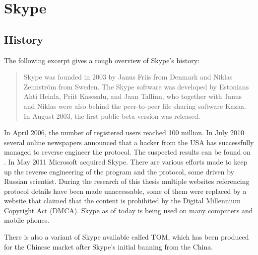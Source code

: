 \section{Skype}
\subsection{History}
The following excerpt\cite{wiki:skype} gives a rough overview of Skype's history:
\begin{quote}
Skype was founded in 2003 by Janus Friis from Denmark and Niklas Zennström from Sweden.
The Skype software was developed by Estonians Ahti Heinla, Priit Kasesalu, and Jaan Tallinn, 
who together with Janus and Niklas were also behind the peer-to-peer file sharing software 
Kazaa. In August 2003, the first public beta version was released.
\end{quote}
In April 2006, the number of registered users reached 100 million.
In July 2010 several online newspapers announced that a hacker from the USA
has successfully managed to reverse engineer the
protocol. The suspected results can be found on \cite{skype:source}.
In May 2011 Microsoft acquired Skype. There are various efforts made to 
keep up the reverse engineering of the program and the 
protocol, some driven by Russian scientist. During the research
of this thesis multiple websites referencing protocol details have been
made unaccessable, some of them were replaced by a website that claimed
that the content is prohibited by the Digital Millennium Copyright Act (DMCA).
Skype as of today is being used on many computers and mobile phones.

There is also a variant of Skype available called TOM, which has been produced
for the Chinese market after Skype's initial banning from the China.
